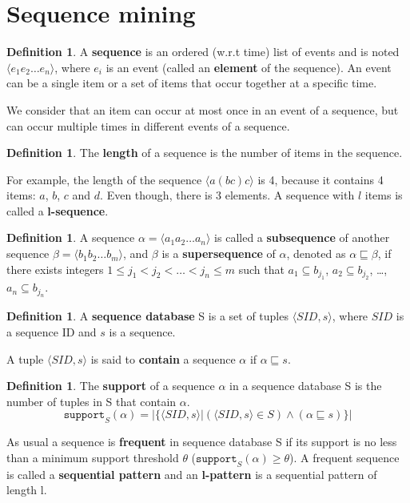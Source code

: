 \documentclass[12pt, openany]{report}
\theoremstyle{definition}
\newtheorem{definition}[thm]{Definition}
\begin{document}
\section{Sequence mining}
\begin{definition}
    A \textbf{sequence} is an ordered (w.r.t time) list of events and is noted $\langle e_1 e_2 \dots e_n \rangle$, where $e_i$ is an event (called an \textbf{element} of the sequence). An event can be a single item or a set of items that occur together at a specific time.
\end{definition}
We consider that an item can occur at most once in an event of a sequence, but can occur multiple times in different events of a sequence.
\begin{definition}
    The \textbf{length} of a sequence is the number of items in the sequence.
\end{definition}
For example, the length of the sequence $\langle a (b c) c \rangle$ is 4, because it contains 4 items: $a$, $b$, $c$ and $d$. Even though, there is 3 elements. A sequence with $l$ items is called a \textbf{l-sequence}.\\
\begin{definition}
    A sequence $\alpha = \langle a_1a_2 \dots a_n\rangle$ is called a \textbf{subsequence} of another sequence $\beta = \langle b_1b_2 \dots b_m \rangle$, and $\beta$ is a \textbf{supersequence} of $\alpha$, denoted as $\alpha \sqsubseteq \beta$, if there exists integers $1 \leq j_1 < j_2 < \dots < j_n \leq m$ such that $a_1 \subseteq b_{j_1}$, $a_2 \subseteq b_{j_2}$, \dots, $a_n \subseteq b_{j_n}$.
\end{definition}
\begin{definition}
    A \textbf{sequence database} S is a set of tuples $\langle SID, s \rangle$, where $SID$ is a sequence ID and $s$ is a sequence.
\end{definition}
A tuple $\langle SID, s \rangle$ is said to \textbf{contain} a sequence $\alpha$ if $\alpha \sqsubseteq s$. 
\begin{definition}
    The \textbf{support} of a sequence $\alpha$ in a sequence database S is the number of tuples in S that contain $\alpha$.
    \begin{equation}
        \texttt{support}_S(\alpha) = | \{ \langle SID, s \rangle | (\langle SID, s \rangle \in S ) \wedge (\alpha \sqsubseteq s) \} | 
    \end{equation}
\end{definition}
As usual a sequence is \textbf{frequent} in sequence database S if its support is no less than a minimum support threshold $\theta$ ($\texttt{support}_S(\alpha) \geq \theta$). A frequent sequence is called a \textbf{sequential pattern} and an \textbf{l-pattern} is a sequential pattern of length l. \\
\end{document}
